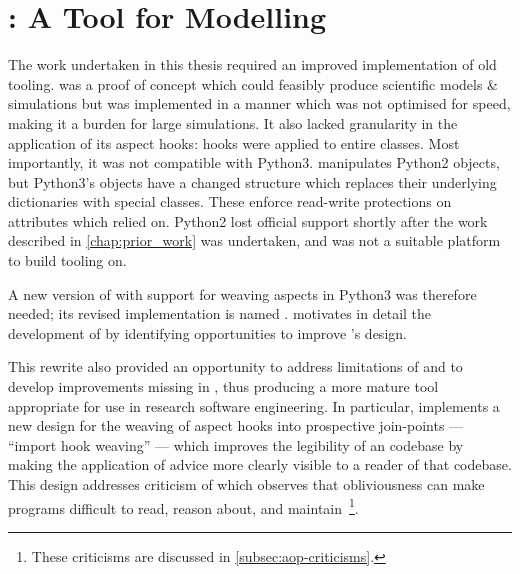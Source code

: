 \chapter{\pdsfthree{}: A Tool for \AspectOriented Modelling}
\label{chap:pdsf_rewrite}




The work undertaken in this thesis required an improved implementation of old
tooling. \pydysofu{} was a proof of concept which could feasibly produce
scientific models \& simulations but was implemented in a manner which was not
optimised for speed, making it a burden for large simulations. It also lacked
granularity in the application of its aspect hooks: hooks were applied to entire
classes. Most importantly, it was not compatible with Python3. \pydysofu{}
manipulates Python2 objects, but Python3's objects have a changed structure
which replaces their underlying dictionaries with special classes. These enforce
read-write protections on attributes which \pydysofu{} relied on. Python2 lost
official support shortly after the work described in \cref{chap:prior_work} was
undertaken, and was not a suitable platform to build tooling on.

A new version of \pydysofu{} with support for weaving aspects in Python3 was
therefore needed; its revised implementation is named \pdsfthree{}.
 motivates in detail the development of \pdsfthree
by identifying opportunities to improve \pydysofu{}'s design.

This rewrite also provided an opportunity to address limitations of \aop{} and
to develop improvements missing in \pydysofu{}, thus producing a more mature
tool appropriate for use in research software engineering. In particular,
\pdsfthree{} implements a new design for the weaving of aspect hooks into
prospective join-points --- ``import hook weaving'' --- which improves the
legibility of an \aspectoriented codebase by making the application of advice
more clearly visible to a reader of that codebase. This design addresses
criticism of \aspectorientation which observes that obliviousness can make
programs difficult to read, reason about, and
maintain~\cite{Constantinides04aopconsidered,steimann06paradoxical,przybylek2010wrong,przybylek2018empirical}\footnote{These
criticisms are discussed in \cref{subsec:aop-criticisms}.}.


